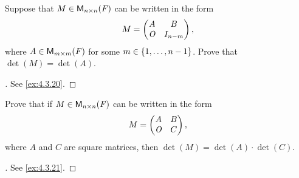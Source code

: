 \exercisesection

\setcounter{ex}{4}
\begin{ex}\label{ex:4.4.5}
	Suppose that \(M \in \ms[n][n][\F]\) can be written in the form
	\[
		M = \begin{pmatrix}
			A   & B         \\
			\mathit{O} & I_{n - m}
		\end{pmatrix},
	\]
	where \(A \in \ms[m][m][\F]\) for some \(m \in \left\lbrace1, \dots, n - 1\right\rbrace\).
	Prove that \(\det(M) = \det(A)\).
\end{ex}

\begin{proof}[]
	See \cref{ex:4.3.20}.
\end{proof}

\begin{ex}\label{ex:4.4.6}
	Prove that if \(M \in \ms[n][n][\F]\) can be written in the form
	\[
		M = \begin{pmatrix}
			A   & B \\
			\mathit{O} & C
		\end{pmatrix},
	\]
	where \(A\) and \(C\) are square matrices, then \(\det(M) = \det(A) \cdot \det(C)\).
\end{ex}

\begin{proof}[]
	See \cref{ex:4.3.21}.
\end{proof}
